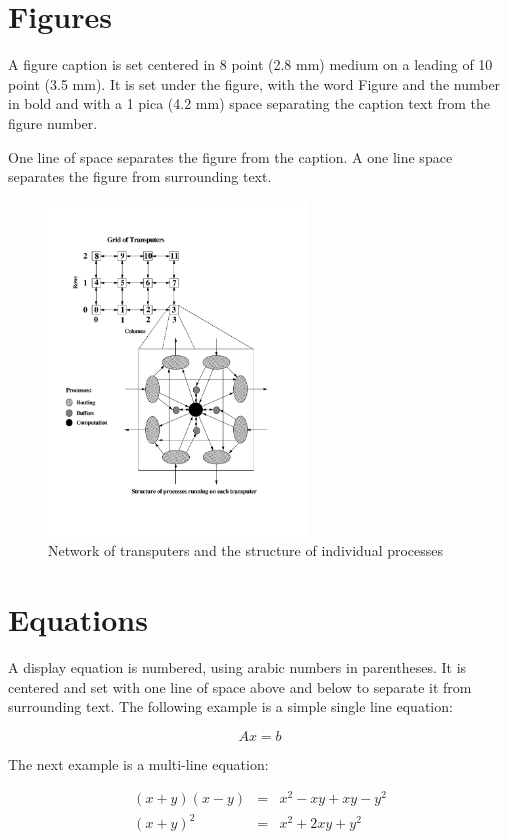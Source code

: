 \documentclass{ecai}  %
\begin{document}
\section{Figures}
A figure caption is set centered in 8 point (2.8 mm) medium on a
leading of 10 point (3.5 mm).  It is set under the figure, with the
word Figure and the number in bold and with a 1 pica (4.2 mm) space
separating the caption text from the figure number.

One line of space separates the figure from the caption. A one line
space separates the figure from surrounding text.

\begin{figure}
\centerline{\includegraphics[height=3.5in]{ecaif01}}
\caption{Network of transputers and the structure of individual
processes } \label{procstructfig}
\end{figure}

\section{Equations}
A display equation is numbered, using arabic numbers in parentheses.
It is centered and set with one line of space above and below to
separate it from surrounding text. The following example is a simple
single line equation:

\begin{equation}
Ax=b
\label{thesystem}
\end{equation}

The next example is a multi-line equation:

\begin{eqnarray}
(x+y)(x-y) & = & x^2-xy+xy-y^2\\
(x+y)^2    & = & x^2+2xy+y^2
\end{eqnarray}
\end{document}
